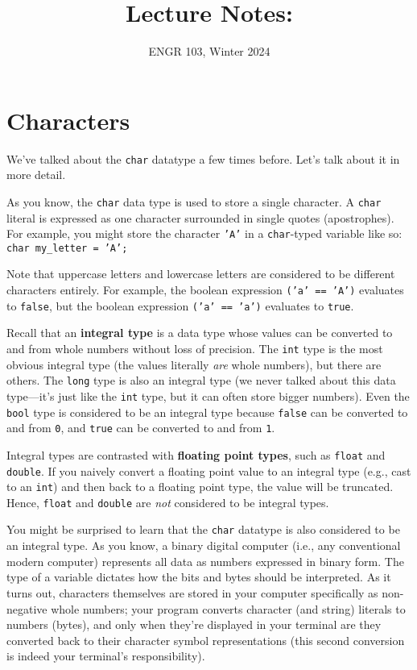 \documentclass{article}
\title{
    Lecture Notes: \lecturetitle
}
\author{ENGR 103, Winter 2024}
\date{}
\begin{document}
\maketitle

\section{Characters}

We've talked about the \texttt{char} datatype a few times before. Let's talk about it in more detail.

As you know, the \texttt{char} data type is used to store a single character. A \texttt{char} literal is expressed as one character surrounded in single quotes (apostrophes). For example, you might store the character \texttt{'A'} in a \texttt{char}-typed variable like so: \texttt{char my\_letter = 'A';}

Note that uppercase letters and lowercase letters are considered to be different characters entirely. For example, the boolean expression \texttt{('a' == 'A')} evaluates to \texttt{false}, but the boolean expression \texttt{('a' == 'a')} evaluates to \texttt{true}.

Recall that an \textbf{integral type} is a data type whose values can be converted to and from whole numbers without loss of precision. The \texttt{int} type is the most obvious integral type (the values literally \textit{are} whole numbers), but there are others. The \texttt{long} type is also an integral type (we never talked about this data type---it's just like the \texttt{int} type, but it can often store bigger numbers). Even the \texttt{bool} type is considered to be an integral type because \texttt{false} can be converted to and from \texttt{0}, and \texttt{true} can be converted to and from \texttt{1}.

Integral types are contrasted with \textbf{floating point types}, such as \texttt{float} and \texttt{double}. If you naively convert a floating point value to an integral type (e.g., cast to an \texttt{int}) and then back to a floating point type, the value will be truncated. Hence, \texttt{float} and \texttt{double} are \textit{not} considered to be integral types.

You might be surprised to learn that the \texttt{char} datatype is also considered to be an integral type. As you know, a binary digital computer (i.e., any conventional modern computer) represents all data as numbers expressed in binary form. The type of a variable dictates how the bits and bytes should be interpreted. As it turns out, characters themselves are stored in your computer specifically as non-negative whole numbers; your program converts character (and string) literals to numbers (bytes), and only when they're displayed in your terminal are they converted back to their character symbol representations (this second conversion is indeed your terminal's responsibility).
\end{document}
